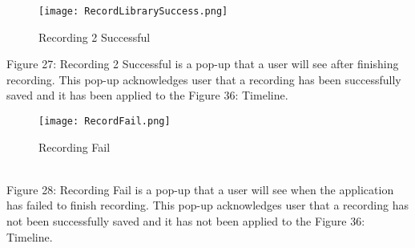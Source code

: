 \documentclass[conference]{IEEEtran}
\begin{document}
\clearpage
\begin{figure}[h]
\centerline{\texttt{[image: RecordLibrarySuccess.png]}}
\caption{Recording 2 Successful}
\label{fig}
\end{figure}
Figure 27: Recording 2 Successful is a pop-up that a user will see after finishing recording. This pop-up acknowledges user that a recording has been successfully saved and it has been applied to the Figure 36: Timeline.
\\
\begin{figure}[h]
\centerline{\texttt{[image: RecordFail.png]}}
\caption{Recording Fail}
\label{fig}
\end{figure}
\\
\indent Figure 28: Recording Fail is a pop-up that a user will see when the application has failed to finish recording. This pop-up acknowledges user that a recording has not been successfully saved and it has not been applied to the Figure 36: Timeline.
\end{document}
